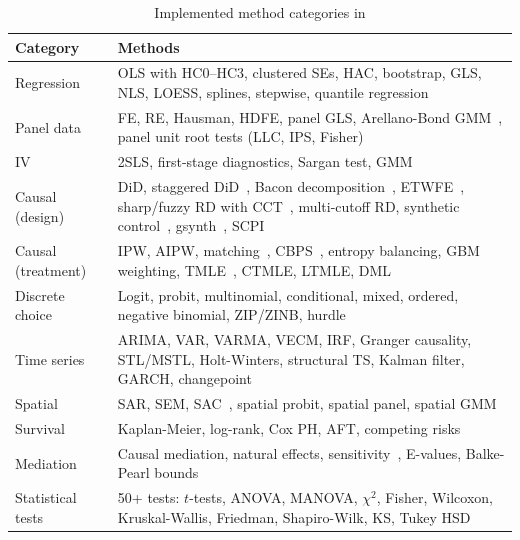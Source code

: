 \begin{table}[htbp]
\centering
\begin{threeparttable}
\caption{Implemented method categories in }
\label{tab:method-categories}
\small
\begin{tabular}{lp{9.5cm}}
\toprule
Category & Methods \\
\midrule
Regression & OLS with HC0--HC3, clustered SEs, HAC, bootstrap, GLS, NLS, LOESS, splines, stepwise, quantile regression~\citep{Koenker+Bassett:1978} \\
Panel data & FE, RE, Hausman, HDFE, panel GLS, Arellano-Bond GMM~\citep{Arellano+Bond:1991}, panel unit root tests (LLC, IPS, Fisher) \\
IV & 2SLS, first-stage diagnostics, Sargan test, GMM~\citep{Hansen:1982} \\
Causal (design) & DiD, staggered DiD~\citep{Callaway+SantAnna:2021}, Bacon decomposition~\citep{Goodman-Bacon:2021}, ETWFE~\citep{Wooldridge:2021}, sharp/fuzzy RD with CCT~\citep{Calonico+etal:2014}, multi-cutoff RD, synthetic control~\citep{Abadie+etal:2010}, gsynth~\citep{Xu:2017}, SCPI~\citep{Cattaneo+etal:2021} \\
Causal (treatment) & IPW, AIPW, matching~\citep{Ho+etal:2011}, CBPS~\citep{Imai+Ratkovic:2014}, entropy balancing, GBM weighting, TMLE~\citep{vanderLaan+Rose:2011}, CTMLE, LTMLE, DML~\citep{Chernozhukov+etal:2018} \\
Discrete choice & Logit, probit, multinomial, conditional, mixed, ordered, negative binomial, ZIP/ZINB, hurdle \\
Time series & ARIMA, VAR, VARMA, VECM, IRF, Granger causality, STL/MSTL, Holt-Winters, structural TS, Kalman filter, GARCH, changepoint \\
Spatial & SAR, SEM, SAC~\citep{Anselin:1988}, spatial probit, spatial panel, spatial GMM \\
Survival & Kaplan-Meier, log-rank, Cox PH, AFT, competing risks \\
Mediation & Causal mediation, natural effects, sensitivity~\citep{Cinelli+Hazlett:2020}, E-values, Balke-Pearl bounds \\
Statistical tests & 50+ tests: $t$-tests, ANOVA, MANOVA, $\chi^2$, Fisher, Wilcoxon, Kruskal-Wallis, Friedman, Shapiro-Wilk, KS, Tukey HSD \\
\bottomrule
\end{tabular}
\end{threeparttable}
\end{table}

